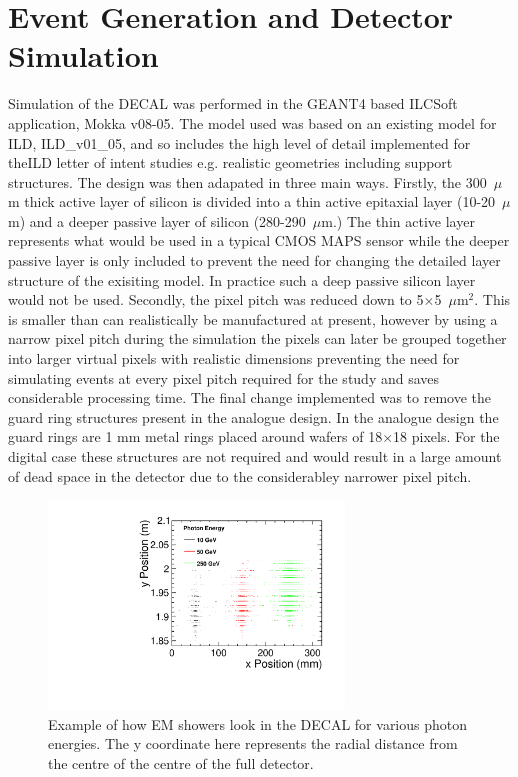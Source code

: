 \section{Event Generation and Detector Simulation}


Simulation of the \ac{DECAL} was performed in the GEANT4 based ILCSoft application, Mokka v08-05. The model used was based on an existing model for \ac{ILD}, ILD\_v01\_05, and so includes the high level of detail implemented for the\ac{ILD} letter of intent studies\cite{ILD} e.g. realistic geometries including support structures. The design was then adapated in three main ways. Firstly, the 300~$\mu$m thick active layer of silicon is divided into a thin active epitaxial layer (10-20~$\mu$m) and a deeper passive layer of silicon (280-290~$\mu$m.) The thin active layer represents what would be used in a typical \ac{CMOS} \ac{MAPS} sensor while the deeper passive layer is only included to prevent the need for changing the detailed layer structure of the exisiting model. In practice such a deep passive silicon layer would not be used. Secondly, the pixel pitch was reduced down to 5$\times$5~$\mu$m$^2$. This is smaller than can realistically be manufactured at present, however by using a narrow pixel pitch during the simulation the pixels can later be grouped together into larger virtual pixels with realistic dimensions preventing the need for simulating events at every pixel pitch required for the study and saves considerable processing time. The final change implemented was to remove the guard ring structures present in the analogue design. In the analogue design the guard rings are 1 mm metal rings placed around wafers of 18$\times$18 pixels. For the digital case these structures are not required and would result in a large amount of dead space in the detector due to the considerabley narrower pixel pitch. 

\begin{figure}
  \centering
  \includegraphics[width=0.7\textwidth,keepaspectratio]{DECALStudies/fig/ExampleEvents}
  \caption{Example of how EM showers look in the \ac{DECAL} for various photon energies. The y coordinate here represents the radial distance from the centre of the centre of the full detector.}
  \label{fig:exampleevents}
\end{figure}

